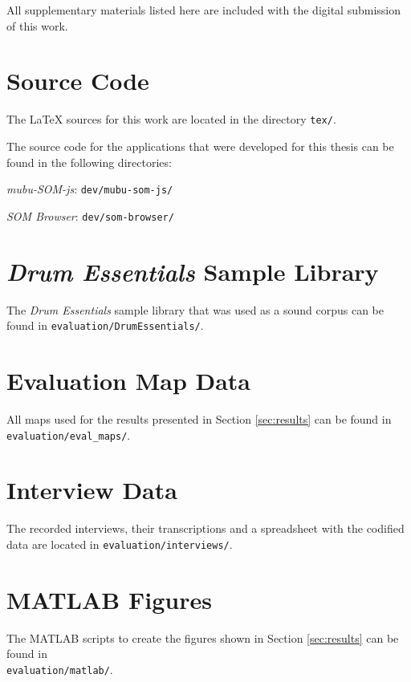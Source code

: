 
\begin{appendices}

All supplementary materials listed here are included with the digital
submission of this work.

\section{Source Code}

The {\LaTeX} sources for this work are located in the directory \texttt{tex/}.

\bigskip

\noindent
The source code for the applications that were developed for this thesis
can be found in the following directories:

\bigskip

\noindent
\textit{mubu-SOM-js}: \quad \texttt{dev/mubu-som-js/}

\bigskip

\noindent
\textit{SOM Browser}: \quad \texttt{dev/som-browser/}

\section{\textit{Drum Essentials} Sample Library}

The \textit{Drum Essentials} sample library that was used as a sound corpus can
be found in \texttt{evaluation/DrumEssentials/}.

\section{Evaluation Map Data}

All maps used for the results presented in Section \ref{sec:results} can be
found in \texttt{evaluation/eval\_maps/}.

\section{Interview Data}

The recorded interviews, their transcriptions and a spreadsheet with the
codified data are located in \texttt{evaluation/interviews/}.

\section{MATLAB Figures}

The MATLAB scripts to create the figures shown in Section \ref{sec:results} can
be found in\\ \texttt{evaluation/matlab/}.


\end{appendices}
